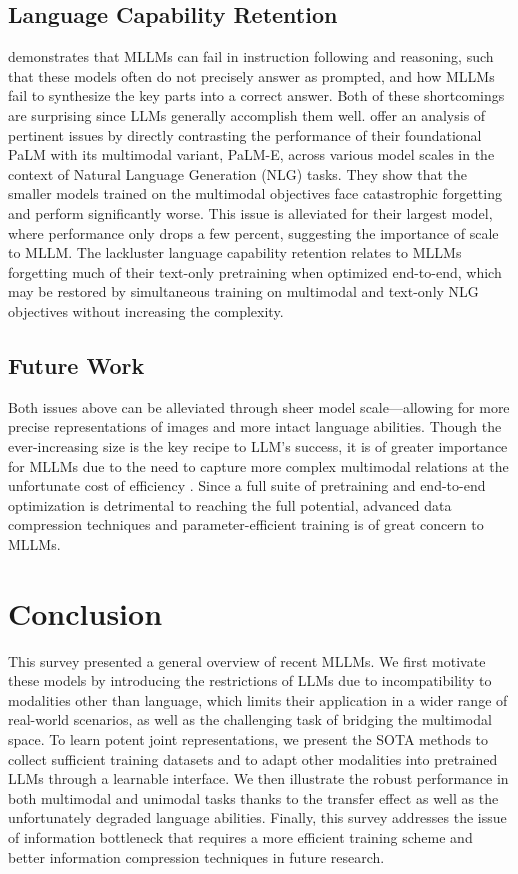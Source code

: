 \documentclass[11pt]{article}
\begin{document}
\subsection{Language Capability Retention}
\citet{fu2023mme} demonstrates that MLLMs can fail in instruction following and reasoning, such that these models often do not precisely answer as prompted, and how MLLMs fail to synthesize the key parts into a correct answer. Both of these shortcomings are surprising since LLMs generally accomplish them well. \citet{DBLP:conf/icml/DriessXSLCIWTVY23} offer an analysis of pertinent issues by directly contrasting the performance of their foundational PaLM with its multimodal variant, PaLM-E, across various model scales in the context of Natural Language Generation (NLG) tasks. They show that the smaller models trained on the multimodal objectives face catastrophic forgetting and perform significantly worse. This issue is alleviated for their largest model, where performance only drops a few percent, suggesting the importance of scale to MLLM. The lackluster language capability retention relates to MLLMs forgetting much of their text-only pretraining when optimized end-to-end, which may be restored by simultaneous training on multimodal and text-only NLG objectives without increasing the complexity.

\subsection{Future Work}
Both issues above can be alleviated through sheer model scale—allowing for more precise representations of images and more intact language abilities. Though the ever-increasing size is the key recipe to LLM's success, it is of greater importance for MLLMs due to the need to capture more complex multimodal relations at the unfortunate cost of efficiency \citep{DBLP:conf/icml/DriessXSLCIWTVY23}. Since a full suite of pretraining and end-to-end optimization is detrimental to reaching the full potential, advanced data compression techniques and parameter-efficient training is of great concern to MLLMs.

\section{Conclusion}
This survey presented a general overview of recent MLLMs. We first motivate these models by introducing the restrictions of LLMs due to incompatibility to modalities other than language, which limits their application in a wider range of real-world scenarios, as well as the challenging task of bridging the multimodal space. To learn potent joint representations, we present the SOTA methods to collect sufficient training datasets and to adapt other modalities into pretrained LLMs through a learnable interface. We then illustrate the robust performance in both multimodal and unimodal tasks thanks to the transfer effect as well as the unfortunately degraded language abilities. Finally, this survey addresses the issue of information bottleneck that requires a more efficient training scheme and better information compression techniques in future research.
\end{document}
